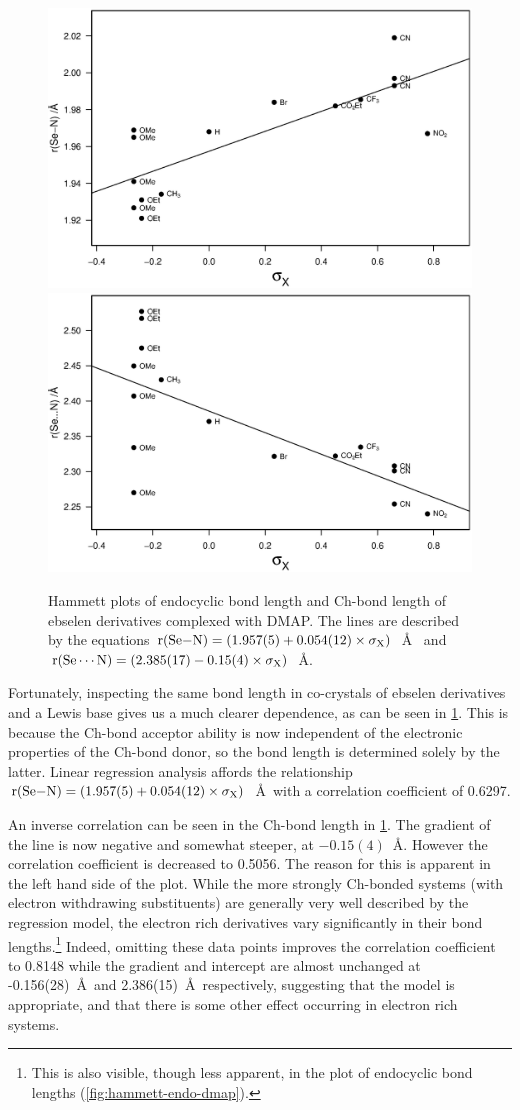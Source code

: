 \begin{figure}
    \centering
    \includegraphics[width=0.48\linewidth]{Figures/hammett-endo-dmap.eps}
    \includegraphics[width=0.48\linewidth]{Figures/hammett-dmap.eps}
    \caption{Hammett plots of endocyclic  bond length and  Ch-bond length of ebselen derivatives complexed with DMAP. The lines are described by the equations $\mathrm{r}(\ce{Se-N}) = (1.957(5) + 0.054(12) \times \sigma_{\mathrm{X}})$~\AA~ and $\mathrm{r}(\ce{Se\cdots N}) = (2.385(17) - 0.15(4) \times \sigma_{\mathrm{X}})$~\AA.}
    \label{fig:hammett-dmap}
\end{figure}

Fortunately, inspecting the same bond length in co-crystals of ebselen derivatives and a Lewis base gives us a much clearer dependence, as can be seen in \ref{fig:hammett-dmap}. 
This is because the Ch-bond acceptor ability is now independent of the electronic properties of the Ch-bond donor, so the  bond length is determined solely by the latter.
Linear regression analysis affords the relationship $\mathrm{r}(\ce{Se-N}) = (1.957(5) + 0.054(12) \times \sigma_{\mathrm{X}})$~\AA~with a correlation coefficient of 0.6297. 

An inverse correlation can be seen in the  Ch-bond length in \ref{fig:hammett-dmap}. 
The gradient of the line is now negative and somewhat steeper, at $-0.15(4)$~\AA.
However the correlation coefficient is decreased to 0.5056.
The reason for this is apparent in the left hand side of the plot.
While the more strongly Ch-bonded systems (with electron withdrawing substituents) are generally very well described by the regression model, the electron rich derivatives  vary significantly in their bond lengths.\footnote{This is also visible, though less apparent, in the plot of endocyclic bond lengths (\ref{fig:hammett-endo-dmap}).}
Indeed, omitting these data points improves the correlation coefficient to 0.8148 while the gradient and intercept are almost unchanged at -0.156(28)~\AA~and 2.386(15)~\AA~respectively, suggesting that the model is appropriate, and that there is some other effect occurring in electron rich systems.

